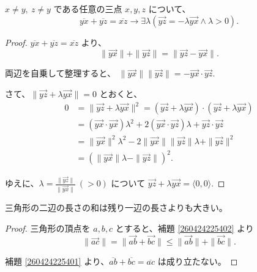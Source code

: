 
\begin{lmm}\label{260424225401}
  \(x\neq y,\ z\neq y\) である任意の三点 \(x,y,z\) について、
  \[\overline{yx}+\overline{yz}=\overline{xz}\rightarrow\exists\lambda(\overrightarrow{yz}=-\lambda\overrightarrow{yx}\land\lambda>0).\]
\end{lmm}

\begin{proof}
  \(\overline{yx}+\overline{yz}=\overline{xz}\) より、
  \[\|\overrightarrow{yx}\|+\|\overrightarrow{yz}\|=\|\overrightarrow{yz}-\overrightarrow{yx}\|.\]

  両辺を自乗して整理すると、
  \(\|\overrightarrow{yx}\|\|\overrightarrow{yz}\|=-\overrightarrow{yx}\cdot\overrightarrow{yz}.\)

  さて、\(\|\overrightarrow{yz}+\lambda\overrightarrow{yx}\|=0\) とおくと、
  \begin{align*}
    0 &=\|\overrightarrow{yz}+\lambda\overrightarrow{yx}\|^2=(\overrightarrow{yz}+\lambda\overrightarrow{yx})\cdot(\overrightarrow{yz}+\lambda\overrightarrow{yx}) \\
      &=(\overrightarrow{yx}\cdot\overrightarrow{yx})\lambda^2+2(\overrightarrow{yx}\cdot\overrightarrow{yz})\lambda+\overrightarrow{yz}\cdot\overrightarrow{yz} \\
      &=\|\overrightarrow{yx}\|^2\lambda^2-2\|\overrightarrow{yx}\|\|\overrightarrow{yz}\|\lambda+\|\overrightarrow{yz}\|^2 \\
      &=(\|\overrightarrow{yx}\|\lambda-\|\overrightarrow{yz}\|)^2.
  \end{align*}

  ゆえに、\(\displaystyle \lambda=\frac{\|\overrightarrow{yz}\|}{\|\overrightarrow{yx}\|}\ (>0)\) について \(\overrightarrow{yz}+\lambda\overrightarrow{yx}=\langle0,0\rangle.\)
\end{proof}


\begin{semi}[線分の最短性の公理]
  三角形の二辺の長さの和は残り一辺の長さよりも大きい。
\end{semi}

\begin{proof}
  三角形の頂点を \(a,b,c\) とすると、補題 \ref{260424225402} より
  \[\|\overrightarrow{ac}\|=\|\overrightarrow{ab}+\overrightarrow{bc}\|\leq\|\overrightarrow{ab}\|+\|\overrightarrow{bc}\|.\]

  補題 \ref{260424225401} より、\(\overline{ab}+\overline{bc}=\overline{ac}\) は成り立たない。
\end{proof}

